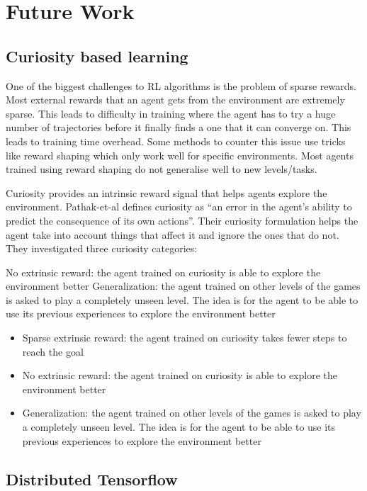 \documentclass[conference]{IEEEtran}
\begin{document}
\section{Future Work}

\subsection{\textbf{Curiosity based learning}}

One of the biggest challenges to RL algorithms is the problem of sparse rewards. Most external rewards that an agent gets from the environment are extremely sparse. This leads to difficulty in training where the agent has to try a huge number of trajectories before it finally finds a one that it can converge on. This leads to training time overhead. Some methods to counter this issue use tricks like reward shaping which only work well for specific environments. Most agents trained using reward shaping do not generalise well to new levels/tasks. 

Curiosity provides an intrinsic reward signal that helps agents explore the environment. Pathak-et-al \cite{Pathak-et-al} defines curiosity as “an error in the agent’s ability to predict the consequence of its own actions”. Their curiosity formulation helps the agent take into account things that affect it and ignore the ones that do not. They investigated three curiosity categories:

No extrinsic reward: the agent trained on curiosity is able to explore the environment better
Generalization: the agent trained on other levels of the games is asked to play a completely unseen level. The idea is for the agent to be able to use its previous experiences to explore the environment better


\begin{itemize}
\item Sparse extrinsic reward: the agent trained on curiosity takes fewer steps to reach the goal
\item No extrinsic reward: the agent trained on curiosity is able to explore the environment better
\item Generalization: the agent trained on other levels of the games is asked to play a completely unseen level.
The idea is for the agent to be able to use its previous experiences to explore the environment better
\end{itemize}

\subsection{\textbf{Distributed Tensorflow}}
\end{document}
